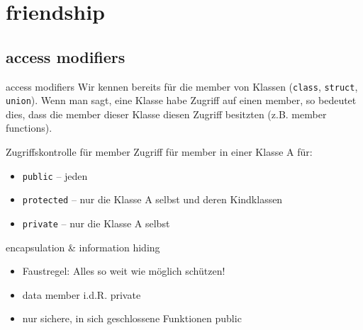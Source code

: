 \section{friendship}





\subsection{access modifiers}

\begin{frame}[fragile]{access modifiers}
	Wir kennen bereits für die member von Klassen (\verb|class|, \verb|struct|, \verb|union|).
	Wenn man sagt, eine Klasse habe Zugriff auf einen member, so bedeutet dies, dass die member dieser Klasse diesen Zugriff besitzten (z.B. member functions).
	
	\pause
	\hspace{1em}
	
	\begin{block}{Zugriffskontrolle für member}
		Zugriff für member in einer Klasse A für:
		\begin{itemize}
			\item \verb|public| -- jeden
			\item \verb|protected| -- nur die Klasse A selbst und deren Kindklassen
			\item \verb|private| -- nur die Klasse A selbst
		\end{itemize}
	\end{block}
\end{frame}


\begin{frame}{encapsulation \& information hiding}
	\begin{itemize}
		\item Faustregel: Alles so weit wie möglich schützen!
		\item data member i.d.R. private
		\item nur sichere, in sich geschlossene Funktionen public
	\end{itemize}
\end{frame}



